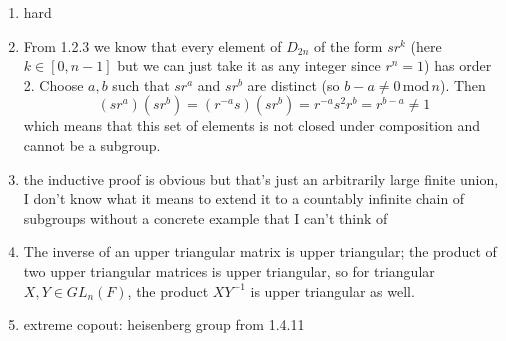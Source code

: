 \documentclass[]{article}
\newcommand{\md}{\,\text{mod}\,}
\begin{document}
\begin{enumerate}
\item {\color{red} hard}


\item From 1.2.3 we know that every element of $D_{2n}$ of the form $sr^k$ (here $k \in [0,n-1]$ but we can just take it as any integer since $r^n = 1$) has order 2. Choose $a,b$ such that $sr^a$ and $sr^b$ are distinct (so $b-a \neq 0 \md n$). Then
\begin{equation}
(sr^a)(sr^b) = (r^{-a}s)(sr^b) = r^{-a}s^2r^b = r^{b-a} \neq 1
\end{equation}
which means that this set of elements is not closed under composition and cannot be a subgroup.


\item {\color{red} the inductive proof is obvious but that's just an arbitrarily large finite union, I don't know what it means to extend it to a countably infinite chain of subgroups without a concrete example that I can't think of}


\item The inverse of an upper triangular matrix is upper triangular; the product of two upper triangular matrices is upper triangular, so for triangular $X,Y \in GL_n(F)$, the product $XY^{-1}$ is upper triangular as well.


\item extreme copout: heisenberg group from 1.4.11


\end{enumerate}











\end{document}
